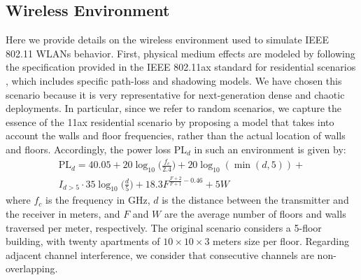 \documentclass{article}
\begin{document}
\begin{appendix}
\section{Wireless Environment}
\label{section:simulated_wireless_environment}	
Here we provide details on the wireless environment used to simulate IEEE 802.11 WLANs behavior. First, physical medium effects are modeled by following the specification provided in the IEEE 802.11ax standard for residential scenarios \cite{merlin2015tgax}, which includes specific path-loss and shadowing models. We have chosen this scenario because it is very representative for next-generation dense and chaotic deployments. In particular, since we refer to random scenarios, we capture the essence of the 11ax residential scenario by proposing a model that takes into account the walls and floor frequencies, rather than the actual location of walls and floors. Accordingly, the power loss $\text{PL}_d$ in such an environment is given by:
\begin{align}
	\text{PL}_d = 40.05 + 20 \log_{10}\Big(\frac{f_c}{2.4}\Big) + 20 \log_{10}(\min(d,5)) + \\\nonumber I_{d>5} \cdot 35\log_{10}\Big(\frac{d}{5}\Big) + 18.3 F^{\frac{F+2}{F+1}-0.46} + 5W
	\nonumber
\end{align}	
where $f_c$ is the frequency in GHz, $d$ is the distance between the transmitter and the receiver in meters, and $F$ and $W$ are the average number of floors and walls traversed per meter, respectively. The original scenario considers a 5-floor building, with twenty apartments of $10\times10\times3$ meters size per floor. Regarding adjacent channel interference, we consider that consecutive channels are non-overlapping. 


\end{appendix}
\end{document}
